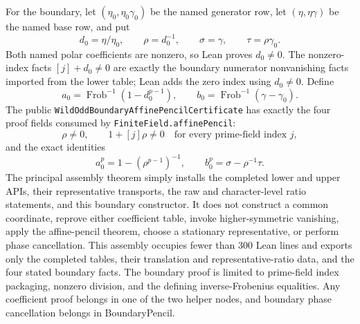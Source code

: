 \begin{theorem}
For the boundary, let $(\eta_0,\eta_0\gamma_0)$ be the named generator row,
let $(\eta,\eta\gamma)$ be the named base row, and put
\[
 d_0=\eta/\eta_0,
 \qquad \rho=d_0^{-1},\qquad
 \sigma=\gamma,\qquad \tau=\rho\gamma_0.
\]
Both named polar coefficients are nonzero, so Lean proves $d_0\ne0$.
The nonzero-index facts $[j]+d_0\ne0$ are exactly the boundary numerator
nonvanishing facts imported from the lower table; Lean adds the zero index
using $d_0\ne0$.  Define
\[
 a_0=\operatorname{Frob}^{-1}(1-d_0^{p-1}),
 \qquad
 b_0=\operatorname{Frob}^{-1}(\gamma-\gamma_0).
\]
The public \texttt{WildOddBoundaryAffinePencilCertificate} has exactly the
four proof fields consumed by \texttt{FiniteField.affinePencil}:
\[
 \rho\ne0,\qquad 1+[j]\rho\ne0
 \quad\text{for every prime-field index }j,
\]
and the exact identities
\[
 a_0^p=1-(\rho^{p-1})^{-1},
 \qquad b_0^p=\sigma-\rho^{-1}\tau.
\]
The principal assembly theorem simply installs the completed lower and upper
APIs, their representative transports, the raw and character-level ratio
statements, and this boundary constructor.  It does not construct a common
coordinate, reprove either coefficient table, invoke higher-symmetric
vanishing, apply the affine-pencil theorem, choose a stationary
representative, or perform phase cancellation.
\leanok
{}
\FormalizationContract
This assembly occupies fewer than 300 Lean lines and exports only the
completed tables, their translation and representative-ratio data, and the
four stated boundary facts.  The boundary proof is limited to prime-field
index packaging, nonzero division, and the defining inverse-Frobenius
equalities.  Any coefficient proof belongs in one of the two helper nodes,
and boundary phase cancellation belongs in BoundaryPencil.
\end{theorem}
